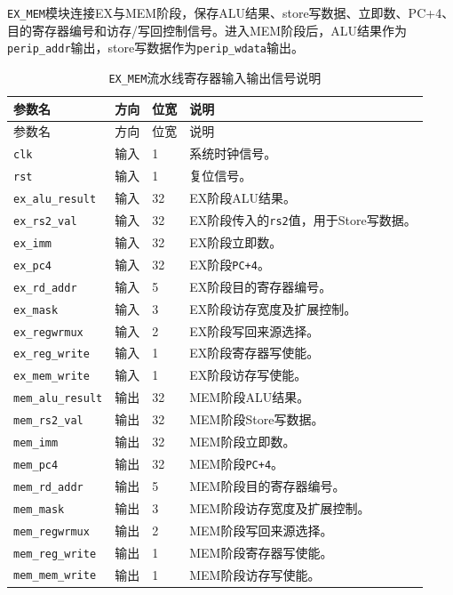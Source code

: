\documentclass[12pt,a4paper]{ctexart}
\newcommand{\code}[1]{\texttt{#1}}
\begin{document}
\code{EX\_MEM}模块连接EX与MEM阶段，保存ALU结果、store写数据、立即数、PC+4、目的寄存器编号和访存/写回控制信号。进入MEM阶段后，ALU结果作为\code{perip\_addr}输出，store写数据作为\code{perip\_wdata}输出。

{\footnotesize
\renewcommand{\arraystretch}{1.12}
\begin{longtable}{p{3.2cm}p{1.5cm}p{2.1cm}p{7.0cm}}
	\caption{\code{EX\_MEM}流水线寄存器输入输出信号说明}                             \\
	\toprule
	参数名                     & 方向 & 位宽 & 说明                             \\
	\midrule
	\endfirsthead
	\toprule
	参数名                     & 方向 & 位宽 & 说明                             \\
	\midrule
	\endhead
	\code{clk}              & 输入 & 1  & 系统时钟信号。                        \\
	\code{rst}              & 输入 & 1  & 复位信号。                          \\
	\code{ex\_alu\_result}  & 输入 & 32 & EX阶段ALU结果。                     \\
	\code{ex\_rs2\_val}     & 输入 & 32 & EX阶段传入的\code{rs2}值，用于Store写数据。 \\
	\code{ex\_imm}          & 输入 & 32 & EX阶段立即数。                       \\
	\code{ex\_pc4}          & 输入 & 32 & EX阶段\code{PC+4}。               \\
	\code{ex\_rd\_addr}     & 输入 & 5  & EX阶段目的寄存器编号。                   \\
	\code{ex\_mask}         & 输入 & 3  & EX阶段访存宽度及扩展控制。                 \\
	\code{ex\_regwrmux}     & 输入 & 2  & EX阶段写回来源选择。                    \\
	\code{ex\_reg\_write}   & 输入 & 1  & EX阶段寄存器写使能。                    \\
	\code{ex\_mem\_write}   & 输入 & 1  & EX阶段访存写使能。                     \\
	\code{mem\_alu\_result} & 输出 & 32 & MEM阶段ALU结果。                    \\
	\code{mem\_rs2\_val}    & 输出 & 32 & MEM阶段Store写数据。                 \\
	\code{mem\_imm}         & 输出 & 32 & MEM阶段立即数。                      \\
	\code{mem\_pc4}         & 输出 & 32 & MEM阶段\code{PC+4}。              \\
	\code{mem\_rd\_addr}    & 输出 & 5  & MEM阶段目的寄存器编号。                  \\
	\code{mem\_mask}        & 输出 & 3  & MEM阶段访存宽度及扩展控制。                \\
	\code{mem\_regwrmux}    & 输出 & 2  & MEM阶段写回来源选择。                   \\
	\code{mem\_reg\_write}  & 输出 & 1  & MEM阶段寄存器写使能。                   \\
	\code{mem\_mem\_write}  & 输出 & 1  & MEM阶段访存写使能。                    \\
	\bottomrule
\end{longtable}
}
\end{document}
